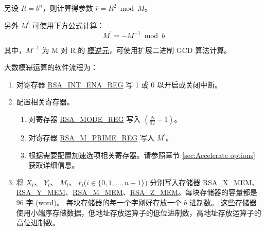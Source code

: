 \documentclass[main\_\_CN.tex]{subfiles}
\begin{document}
另设 \begin{math}R = b^{n}\end{math}，则计算得参数 \begin{math}\overline{r} = R^{2} \bmod M\end{math}。

另外 \begin{math}M^{\prime}\end{math} 可使用下方公式计算：
\[
        M^{\prime} = - M^{-1} \bmod b
\]

其中，$M^{-1}$ 为 M 对 R 的 \href{https://zh.wikipedia.org/wiki/\%E6\%A8\%A1\%E5\%8F\%8D\%E5\%85\%83\%E7\%B4\%A0}{模逆元}，可使用扩展二进制 GCD 算法计算。

大数模幂运算的软件流程为：

\begin{enumerate}

    \item 对寄存器 \hyperref[regdesc:RSAINTENAREG]{RSA\_INT\_ENA\_REG} 写 1 或 0 以开启或关闭中断。

    \item 配置相关寄存器。

    \begin{enumerate}
        \item 对寄存器 \hyperref[regdesc:RSAMODEREG]{RSA\_MODE\_REG} 写入 \begin{math}( \frac{N}{32} - 1 )\end{math}。

        \item 对寄存器 \hyperref[regdesc:RSAMPRIMEREG]{RSA\_M\_PRIME\_REG} 写入 \begin{math}M^{\prime}\end{math}。

        \item 根据需要配置加速选项相关寄存器。请参照章节 \ref{sec:Accelerate options} 获取详细信息。
    \end{enumerate}

    \item 将
        \begin{math}X_{i}\end{math}、
        \begin{math}Y_{i}\end{math}、
        \begin{math}M_{i}\end{math}、
        \begin{math}\overline{r}_{i}\end{math}(\begin{math}i \in \{ 0, 1, \dots, n-1 \end{math}\})
        分别写入存储器 \hyperref[tab:rsa-mem]{RSA\_X\_MEM}、\hyperref[tab:rsa-mem]{\hyperref[tab:rsa-mem]{RSA\_Y\_MEM}}、\hyperref[tab:rsa-mem]{RSA\_M\_MEM}、\hyperref[tab:rsa-mem]{RSA\_Z\_MEM}。每块存储器的容量都是 96 字 (word)。
        每块存储器的每一个字刚好存放一个 \begin{math}b\end{math} 进制数。
        这些存储器使用小端序存储数据，低地址存放运算子的低位进制数，高地址存放运算子的高位进制数。


\end{enumerate}
\end{document}
